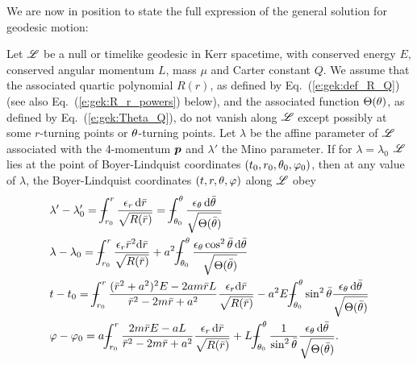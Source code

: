We are now in position to state the full expression of the general
solution for geodesic motion:
\begin{prop}
Let $\mathscr{L}$ be a null or timelike geodesic in Kerr spacetime,
with conserved energy $E$, conserved angular momentum $L$, mass $\mu$ and
Carter constant $Q$. We assume that the associated quartic polynomial $R(r)$,
as defined by Eq.~(\ref{e:gek:def_R_Q}) (see also Eq.~(\ref{e:gek:R_r_powers}) below),
and the associated function $\Theta(\theta)$, as defined by Eq.~(\ref{e:gek:Theta_Q}),
do not vanish along $\mathscr{L}$ except possibly at some $r$-turning points or
$\theta$-turning points.
Let $\lambda$ be the affine parameter of $\mathscr{L}$
associated with the 4-momentum $\bm{p}$ and $\lambda'$ the
Mino parameter. If for $\lambda=\lambda_0$
$\mathscr{L}$ lies at the point of Boyer-Lindquist coordinates $(t_0,r_0,\theta_0,\varphi_0)$,
then at any value of $\lambda$, the Boyer-Lindquist coordinates $(t,r,\theta,\varphi)$ along $\mathscr{L}$
obey
\begin{subequations}
\label{e:gek:integrated_eqs}
\begin{align}
 & \lambda' - \lambda'_0 = \dashint_{r_0}^r \frac{\eps_r \, \D \bar{r}}{\sqrt{R(\bar{r})}}
   = \dashint_{\th_0}^\th \frac{\eps_\th \, \D \bar{\th}}{\sqrt{\Theta(\bar{\th})}}
    \label{e:gek:integr_Mino}\\
 & \lambda - \lambda_0 = \dashint_{r_0}^r \frac{\eps_r \bar{r}^2 \D \bar{r}}{\sqrt{R(\bar{r})}}
    + a^2 \dashint_{\th_0}^\th \frac{\eps_\th \cos^2\bar{\th} \, \D \bar{\th}}{\sqrt{\Theta(\bar{\th})}}
    \label{e:gek:integr_lambda} \\
 & t - t_0 = \dashint_{r_0}^r  \frac{(\bar{r}^2 + a^2)^2 E - 2 a m \bar{r} L}{\bar{r}^2 - 2m\bar{r} + a^2} \frac{\eps_r\D \bar{r}}{\sqrt{R(\bar{r})}}
 - a^2 E \dashint_{\th_0}^\th  \sin^2\bar{\th}  \frac{\eps_\th \, \D \bar{\th}}{\sqrt{\Theta(\bar{\th})}} \label{e:gek:integr_t} \\
 & \ph - \ph_0 = a \dashint_{r_0}^r  \frac{2m\bar{r} E - a L}{\bar{r}^2 - 2m \bar{r} + a^2}
    \frac{\eps_r \, \D \bar{r}}{\sqrt{R(\bar{r})}}
    + L \dashint_{\th_0}^\th \frac{1}{\sin^2\bar{\th}} \frac{\eps_\th \, \D \bar{\th}}{\sqrt{\Theta(\bar{\th})}} . \label{e:gek:integr_ph}
\end{align}
\end{subequations}
\end{prop}
